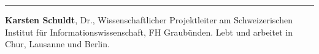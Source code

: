 \begin{center}\rule{0.5\linewidth}{0.5pt}\end{center}

\textbf{Karsten Schuldt}, Dr., Wissenschaftlicher Projektleiter am
Schweizerischen Institut für Informationswissenschaft, FH Graubünden.
Lebt und arbeitet in Chur, Lausanne und Berlin.
